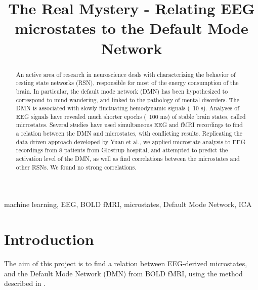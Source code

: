 \documentclass{article}
\title{The Real Mystery - Relating EEG microstates to the Default Mode Network}
\begin{document}
%

\maketitle
%
\begin{abstract}An active area of research in neuroscience deals with characterizing the behavior of resting state networks (RSN), responsible for most of the energy consumption of the brain. In particular, the default mode network (DMN) has been hypothesized to correspond to mind-wandering, and linked to the pathology of mental disorders. The DMN is associated with slowly fluctuating hemodynamic signals (~10 s). Analyses of EEG signals have revealed much shorter epochs (~100 ms) of stable brain states, called microstates. Several studies have used simultaneous EEG and fMRI recordings to find a relation between the DMN and microstates, with conflicting results. Replicating the data-driven approach developed by Yuan et al., we applied microstate analysis to EEG recordings from 8 patients from Glostrup hospital, and attempted to predict the activation level of the DMN, as well as find correlations between the microstates and other RSNs. We found no strong correlations.

\end{abstract}
%
\begin{keywords}
machine learning, EEG, BOLD fMRI, microstates, Default Mode Network, ICA
\end{keywords}
%
\section{Introduction}The aim of this project is to find a relation between EEG-derived microstates, and the Default Mode Network (DMN) from BOLD fMRI, using the method described in \cite{Yuan20122062}.
\end{document}
